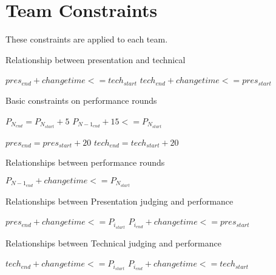 \documentclass[letterpaper,11pt]{report}
\begin{document}
\section{Team Constraints}
These constraints are applied to each team.

\begin{algorithm}
\caption{Relationship between presentation and technical}
\begin{algorithmic}
  \STATE $pres_{end} + changetime <= tech_{start}$
\ELSE
  \STATE $tech_{end} + changetime <= pres_{start}$
\ENDIF
\end{algorithmic}
\end{algorithm}

\begin{algorithm}
\caption{Basic constraints on performance rounds}
\begin{algorithmic}
  \STATE $P_{N_{end}} = P_{N_{start}} + 5$
\ENDFOR
{}
  \STATE $P_{{N-1}_{end}} + 15 <= P_{N_{start}}$
\ENDFOR

\STATE $pres_{end} = pres_{start} + 20$
\STATE $tech_{end} = tech_{start} + 20$
\end{algorithmic}
\end{algorithm}

\begin{algorithm}
\caption{Relationships between performance rounds}
\begin{algorithmic}
  \STATE $P_{{N-1}_{end}} + changetime <= P_{N_{start}}$
\ENDFOR
\end{algorithmic}
\end{algorithm}

\begin{algorithm}
\caption{Relationships between Presentation judging and performance}
\begin{algorithmic}
    \STATE $pres_{end} + changetime <= P_{i_{start}}$
  \ELSE
    \STATE $P_{i_{end}} + changetime <= pres_{start}$
  \ENDIF
\ENDFOR
\end{algorithmic}
\end{algorithm}

\begin{algorithm}
\caption{Relationships between Technical judging and performance}
\begin{algorithmic}
    \STATE $tech_{end} + changetime <= P_{i_{start}}$
  \ELSE
    \STATE $P_{i_{end}} + changetime <= tech_{start}$
  \ENDIF
\ENDFOR
\end{algorithmic}
\end{algorithm}
\end{document}
